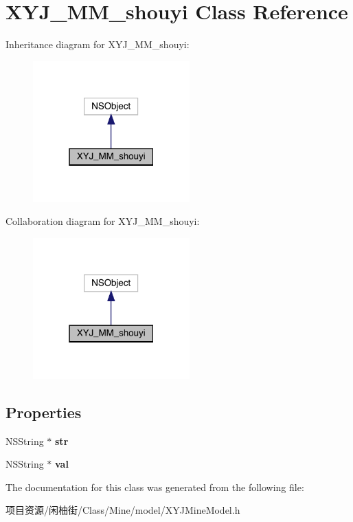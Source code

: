 \hypertarget{interface_x_y_j___m_m__shouyi}{}\section{X\+Y\+J\+\_\+\+M\+M\+\_\+shouyi Class Reference}
\label{interface_x_y_j___m_m__shouyi}


Inheritance diagram for X\+Y\+J\+\_\+\+M\+M\+\_\+shouyi\+:\nopagebreak
\begin{figure}[H]
\begin{center}
\leavevmode
\includegraphics[width=171pt]{interface_x_y_j___m_m__shouyi__inherit__graph}
\end{center}
\end{figure}


Collaboration diagram for X\+Y\+J\+\_\+\+M\+M\+\_\+shouyi\+:\nopagebreak
\begin{figure}[H]
\begin{center}
\leavevmode
\includegraphics[width=171pt]{interface_x_y_j___m_m__shouyi__coll__graph}
\end{center}
\end{figure}
\subsection*{Properties}
\begin{DoxyCompactItemize}
\item 
\mbox{\label{interface_x_y_j___m_m__shouyi_a9133faeb19c2c81ec032d13801308e32}} 
N\+S\+String $\ast$ {\bfseries str}
\item 
\mbox{\label{interface_x_y_j___m_m__shouyi_a9e1c14dad473e7d4c950485fd31d8609}} 
N\+S\+String $\ast$ {\bfseries val}
\end{DoxyCompactItemize}


The documentation for this class was generated from the following file\+:\begin{DoxyCompactItemize}
\item 
项目资源/闲柚街/\+Class/\+Mine/model/X\+Y\+J\+Mine\+Model.\+h\end{DoxyCompactItemize}
